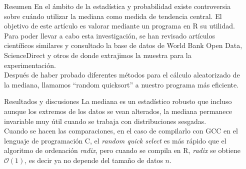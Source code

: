 \documentclass[final]{beamer}
\newlength{\sepwid}
\newlength{\onecolwid}
\begin{document}
\begin{frame}[t]
\begin{columns}[t]
		\begin{column}{\sepwid}\end{column}

		\begin{column}{\onecolwid} %

			\begin{block}{Resumen}
				En el ámbito de la estadística y probabilidad existe controversia sobre cuándo utilizar la mediana como medida de tendencia central. El objetivo de este artículo es valorar mediante un programa en R su utilidad. Para poder llevar a cabo esta investigación, se han revisado artículos científicos similares y consultado la base de datos de World Bank Open Data, ScienceDirect y otros de donde extrajimos la muestra para la experimentación.\\[0.5\baselineskip]
				Después de haber probado diferentes métodos para el cálculo aleatorizado de la mediana, llamamos ``random quicksort'' a nuestro programa más eficiente.
			\end{block}
			\vspace{-0.5cm}

			\begin{block}{Resultados y discusiones}
				La mediana es un estadístico robusto que incluso aunque los extremos de los datos se vean alterados, la mediana permanece invariable muy útil cuando se trabaja con distribuciones sesgadas.\\[0.5\baselineskip]
				Cuando se hacen las comparaciones, en el caso de compilarlo con GCC en el lenguaje de programación C, el \emph{random quick select} es más rápido que el algoritmo de ordenación \emph{radix}, pero cuando se compila en R, \emph{radix} se obtiene $\mathcal{O}(1)$, es decir ya no depende del tamaño de datos $n$.
			\end{block}
			\vspace{-0.8cm}


\end{column}
\end{columns}
\end{frame}
\end{document}
